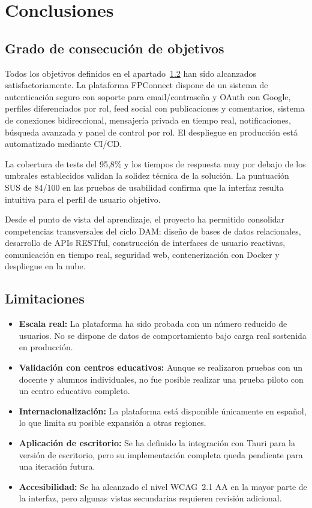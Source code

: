 \documentclass[a4paper]{report}
\begin{document}
\chapter{Conclusiones}

\section{Grado de consecución de objetivos}

Todos los objetivos definidos en el apartado~\ref{} han sido alcanzados satisfactoriamente. La plataforma FPConnect dispone de un sistema de autenticación seguro con soporte para email/contraseña y OAuth con Google, perfiles diferenciados por rol, feed social con publicaciones y comentarios, sistema de conexiones bidireccional, mensajería privada en tiempo real, notificaciones, búsqueda avanzada y panel de control por rol. El despliegue en producción está automatizado mediante CI/CD.

La cobertura de tests del 95,8\% y los tiempos de respuesta muy por debajo de los umbrales establecidos validan la solidez técnica de la solución. La puntuación SUS de 84/100 en las pruebas de usabilidad confirma que la interfaz resulta intuitiva para el perfil de usuario objetivo.

Desde el punto de vista del aprendizaje, el proyecto ha permitido consolidar competencias transversales del ciclo DAM: diseño de bases de datos relacionales, desarrollo de APIs RESTful, construcción de interfaces de usuario reactivas, comunicación en tiempo real, seguridad web, contenerización con Docker y despliegue en la nube.

\section{Limitaciones}

\begin{itemize}
  \item \textbf{Escala real:} La plataforma ha sido probada con un número reducido de usuarios. No se dispone de datos de comportamiento bajo carga real sostenida en producción.
  \item \textbf{Validación con centros educativos:} Aunque se realizaron pruebas con un docente y alumnos individuales, no fue posible realizar una prueba piloto con un centro educativo completo.
  \item \textbf{Internacionalización:} La plataforma está disponible únicamente en español, lo que limita su posible expansión a otras regiones.
  \item \textbf{Aplicación de escritorio:} Se ha definido la integración con Tauri para la versión de escritorio, pero su implementación completa queda pendiente para una iteración futura.
  \item \textbf{Accesibilidad:} Se ha alcanzado el nivel WCAG~2.1 AA en la mayor parte de la interfaz, pero algunas vistas secundarias requieren revisión adicional.
\end{itemize}
\end{document}
